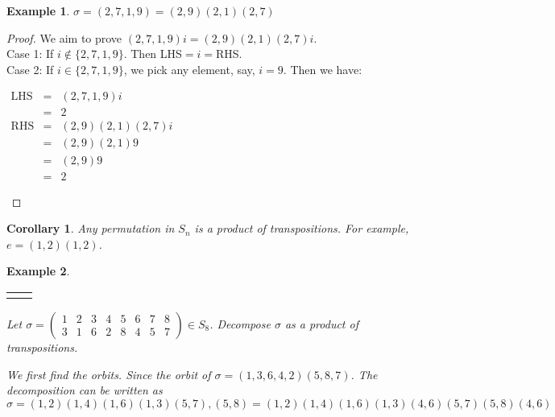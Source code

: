 \documentclass{article}
\theoremstyle{MyNonumberplain}
\theoremstyle{break}
\newtheorem*{proof}{Proof. }
\newcommand{\nline}{\begin{tabular}{ll}&\\\end{tabular}}
\newcommand{\nin}{\not\in}
\newcommand{\tmop}{\text}
\theoremstyle{break}
\newtheorem{corollary}{Corollary}[theorem]
\newtheorem{example}{Example}[section]
\theoremstyle{break}
\theoremstyle{definition}
\theoremstyle{break}
\begin{document}
\begin{expbox}
    \begin{example}
        $\sigma = (2, 7, 1, 9) = (2, 9) (2, 1) (2, 7)$
    \end{example}
    \begin{prfbox}
        \begin{proof}
            We aim to prove $(2, 7, 1, 9) i = (2, 9) (2, 1) (2, 7) i$.\\

            Case 1: If $i \nin  \{ 2, 7, 1, 9 \}$. Then LHS$=i=$RHS.\\

            Case 2: If $i \in \{ 2, 7, 1, 9 \}$, we pick any element, say, $i=9$. Then we have:\\

            \begin{center}
                $\begin{array}{lll}
                    \tmop{LHS} & = & (2, 7, 1, 9) i\\
                    & = & 2\\
                    \tmop{RHS} & = & (2, 9) (2, 1) (2, 7) i\\
                    & = & (2, 9) (2, 1) 9\\
                    & = & (2, 9) 9\\
                    & = & 2
                \end{array}$
            \end{center}
        \end{proof}
    \end{prfbox}
\end{expbox}

\begin{thmbox}
    \begin{corollary}
        Any permutation in $S_n$ is a product of transpositions. For example, $e=(1,2)(1,2)$.
    \end{corollary}
\end{thmbox}

\begin{expbox}
    \begin{example}

        \nline

        Let $\sigma = \left(\begin{array}{cccccccc}
            1 & 2 & 3 & 4 & 5 & 6 & 7 & 8\\
            3 & 1 & 6 & 2 & 8 & 4 & 5 & 7
        \end{array}\right) \in S_8$. Decompose $\sigma$ as a product of
        transpositions.

        \begin{ansbox}
            We first find the orbits. Since the orbit of $\sigma = (1, 3, 6, 4, 2) (5, 8,
            7)$. The decomposition can be written as
            \[ \sigma = (1, 2) (1, 4) (1, 6) (1, 3) (5, 7), (5, 8) = (1, 2) (1, 4) (1, 6)
            (1, 3) (4, 6) (5, 7) (5, 8) (4, 6) \]
    
        \end{ansbox}

    \end{example}
\end{expbox}
\end{document}

